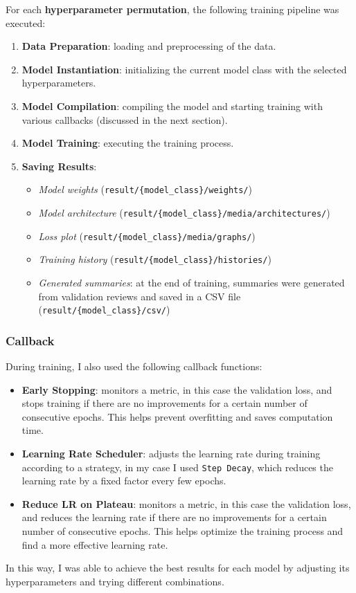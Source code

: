 For each \textbf{hyperparameter permutation}, the following training pipeline was executed:
\begin{enumerate}
    \item \textbf{Data Preparation}: loading and preprocessing of the data.
    \item \textbf{Model Instantiation}: initializing the current model class with the selected hyperparameters.
    \item \textbf{Model Compilation}: compiling the model and starting training with various callbacks (discussed in the next section).
    \item \textbf{Model Training}: executing the training process.
    \item \textbf{Saving Results}:
          \begin{itemize}
              \item \textit{Model weights} (\texttt{result/\{model\_class\}/weights/})
              \item \textit{Model architecture} (\texttt{result/\{model\_class\}/media/architectures/})
              \item \textit{Loss plot} (\texttt{result/\{model\_class\}/media/graphs/})
              \item \textit{Training history} (\texttt{result/\{model\_class\}/histories/})
              \item \textit{Generated summaries}: at the end of training, summaries were generated from validation reviews and saved in a CSV file (\texttt{result/\{model\_class\}/csv/})
          \end{itemize}
\end{enumerate}

\subsubsection{Callback}
During training, I also used the following callback functions:
\begin{itemize}
    \item \textbf{Early Stopping}: monitors a metric, in this case the validation loss, and stops training if there are no improvements for a certain number of consecutive epochs. This helps prevent overfitting and saves computation time.
    \item \textbf{Learning Rate Scheduler}: adjusts the learning rate during training according to a strategy, in my case I used \texttt{Step Decay}, which reduces the learning rate by a fixed factor every few epochs.
    \item \textbf{Reduce LR on Plateau}: monitors a metric, in this case the validation loss, and reduces the learning rate if there are no improvements for a certain number of consecutive epochs. This helps optimize the training process and find a more effective learning rate.
\end{itemize}
In this way, I was able to achieve the best results for each model by adjusting its hyperparameters and trying different combinations.

